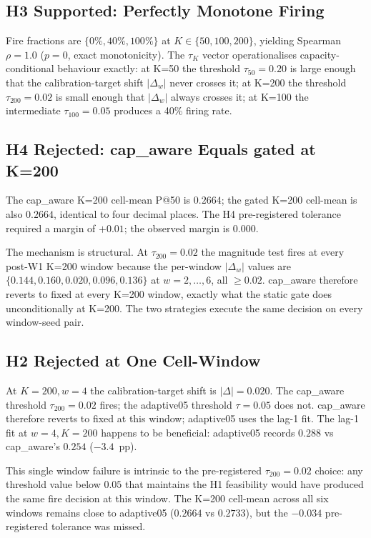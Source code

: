 \subsection{H3 Supported: Perfectly Monotone Firing}

Fire fractions are $\{0\%, 40\%, 100\%\}$ at $K \in \{50, 100, 200\}$,
yielding Spearman $\rho = 1.0$ ($p = 0$, exact monotonicity). The
$\tau_K$ vector operationalises capacity-conditional behaviour
exactly: at K=50 the threshold $\tau_{50} = 0.20$ is large enough
that the calibration-target shift $|\Delta_w|$ never crosses it; at
K=200 the threshold $\tau_{200} = 0.02$ is small enough that
$|\Delta_w|$ always crosses it; at K=100 the intermediate
$\tau_{100} = 0.05$ produces a 40\% firing rate.

\subsection{H4 Rejected: cap\_aware Equals gated at K=200}



The cap\_aware K=200 cell-mean P@50 is $0.2664$; the gated K=200
cell-mean is also $0.2664$, identical to four decimal places. The
H4 pre-registered tolerance required a margin of $+0.01$;
the observed margin is $0.000$.

The mechanism is structural. At $\tau_{200} = 0.02$ the magnitude
test fires at every post-W1 K=200 window because the per-window
$|\Delta_w|$ values are $\{0.144, 0.160, 0.020, 0.096, 0.136\}$ at
$w = 2, \ldots, 6$, all $\geq 0.02$. cap\_aware therefore reverts to
fixed at every K=200 window, exactly what the static gate does
unconditionally at K=200. The two strategies execute the same decision
on every window-seed pair.

\subsection{H2 Rejected at One Cell-Window}

At $K=200, w=4$ the calibration-target shift is $|\Delta| = 0.020$.
The cap\_aware threshold $\tau_{200} = 0.02$ fires; the adaptive05
threshold $\tau = 0.05$ does not. cap\_aware therefore reverts to
fixed at this window; adaptive05 uses the lag-1 fit. The lag-1 fit
at $w = 4, K = 200$ happens to be beneficial: adaptive05 records
$0.288$ vs cap\_aware's $0.254$ ($-3.4$~pp).

This single window failure is intrinsic to the pre-registered
$\tau_{200} = 0.02$ choice: any threshold value below $0.05$ that
maintains the H1 feasibility would have produced the same fire
decision at this window. The K=200 cell-mean across all six windows
remains close to adaptive05 ($0.2664$ vs $0.2733$), but the
$-0.034$ pre-registered tolerance was missed.

